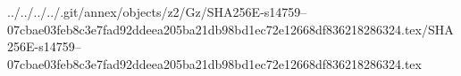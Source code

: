 ../../../../.git/annex/objects/z2/Gz/SHA256E-s14759--07cbae03feb8c3e7fad92ddeea205ba21db98bd1ec72e12668df836218286324.tex/SHA256E-s14759--07cbae03feb8c3e7fad92ddeea205ba21db98bd1ec72e12668df836218286324.tex